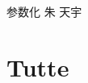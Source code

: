 \documentclass[a4paper]{D:/MyRepo/latex/PaperReadingLog}
\begin{document}
\PaperInfo
{参数化}
{朱}
{天宇}
{}
\section{Tutte}

\end{document}
